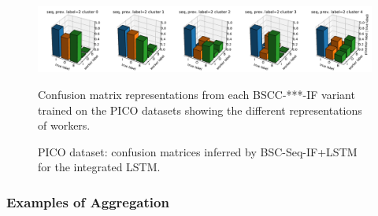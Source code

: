 \begin{figure}
{  \includegraphics[width=1\textwidth, clip=True, trim=0 10 0 27]{figures/worker_models/seq_prev2}
} \\
\caption{Confusion matrix representations from each BSCC-***-IF variant trained on the PICO datasets 
showing the different representations of workers. 
}
\label{fig:conf_mat_clusters}

\end{figure}

\begin{figure}
\centering
{}
\caption{PICO dataset: confusion matrices inferred by BSC-Seq-IF+LSTM for the integrated LSTM. }
\label{fig:conf_mat_lstm}
\end{figure}

\subsubsection{Examples of Aggregation}


